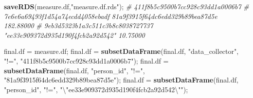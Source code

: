 \documentclass[]{article}
\newenvironment{Shaded}{\begin{snugshade}}{\end{snugshade}}
\newcommand{\CharTok}[1]{\textcolor[rgb]{0.31,0.60,0.02}{#1}}
\newcommand{\CommentTok}[1]{\textcolor[rgb]{0.56,0.35,0.01}{\textit{#1}}}
\newcommand{\KeywordTok}[1]{\textcolor[rgb]{0.13,0.29,0.53}{\textbf{#1}}}
\newcommand{\NormalTok}[1]{#1}
\newcommand{\StringTok}[1]{\textcolor[rgb]{0.31,0.60,0.02}{#1}}
\begin{document}
\begin{Shaded}
\begin{Highlighting}[]
\KeywordTok{saveRDS}\NormalTok{(measure.df,}\StringTok{"measure.df.rds"}\NormalTok{);}
\CommentTok{\# 411f8b5c9500b7cc928c93dd1a0006b7}
\CommentTok{\# 7e6e6a69493f1d54a74ecdd4058ebadf 81a9f3915f64dc6edd329b89bea87d5e 182.88000}
\CommentTok{\#   9eb3d5323b1a3c511c3b8c8038727737  "ee33e909372d935d190f4fcb2a92d542"  10.75000}
\end{Highlighting}
\end{Shaded}

\begin{Shaded}
\begin{Highlighting}[]
\NormalTok{final.df =}\StringTok{ }\NormalTok{measure.df;}
\NormalTok{final.df =}\StringTok{ }\KeywordTok{subsetDataFrame}\NormalTok{(final.df, }\StringTok{"data\_collector"}\NormalTok{, }\StringTok{"!="}\NormalTok{, }\StringTok{"411f8b5c9500b7cc928c93dd1a0006b7"}\NormalTok{);}
\NormalTok{final.df =}\StringTok{ }\KeywordTok{subsetDataFrame}\NormalTok{(final.df, }\StringTok{"person\_id"}\NormalTok{, }\StringTok{"!="}\NormalTok{, }\StringTok{"81a9f3915f64dc6edd329b89bea87d5e"}\NormalTok{);}
\NormalTok{final.df =}\StringTok{ }\KeywordTok{subsetDataFrame}\NormalTok{(final.df, }\StringTok{"person\_id"}\NormalTok{, }\StringTok{"!="}\NormalTok{, }\StringTok{"}\CharTok{\textbackslash{}"}\StringTok{ee33e909372d935d190f4fcb2a92d542}\CharTok{\textbackslash{}"}\StringTok{"}\NormalTok{);}


\end{Highlighting}
\end{Shaded}
\end{document}
